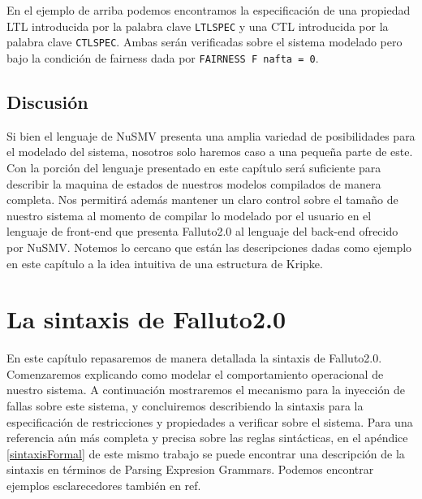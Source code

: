 \documentclass[titlepage, 12pt]{book}
\begin{document}
En el ejemplo de arriba podemos encontramos la especificaci\'on de una propiedad LTL introducida por la palabra clave \texttt{LTLSPEC} y una CTL introducida por la palabra clave \texttt{CTLSPEC}. Ambas ser\'an verificadas sobre el sistema modelado pero bajo la condici\'on de fairness dada por \texttt{FAIRNESS F nafta = 0}.

\section*{Discusi\'on}

Si bien el lenguaje de NuSMV presenta una amplia variedad de posibilidades para el modelado del sistema, nosotros solo haremos caso a una peque\~na parte de este. Con la porci\'on del lenguaje presentado en este cap\'itulo ser\'a suficiente para describir la maquina de estados de nuestros modelos compilados de manera completa. Nos permitir\'a adem\'as mantener un claro control sobre el tama\~no de nuestro sistema al momento de compilar lo modelado por el usuario en el lenguaje de front-end que presenta Falluto2.0 al lenguaje del back-end ofrecido por NuSMV. Notemos lo cercano que est\'an las descripciones dadas como ejemplo en este cap\'itulo a la idea intuitiva de una estructura de Kripke.



\chapter{La sintaxis de Falluto2.0}
\label{sintaxisDeFalluto}

En este cap\'itulo repasaremos de manera detallada la sintaxis de Falluto2.0. Comenzaremos explicando como modelar el comportamiento operacional de nuestro sistema. A continuaci\'on mostraremos el mecanismo para la inyecci\'on de fallas sobre este sistema, y concluiremos describiendo la sintaxis para la especificaci\'on de restricciones y propiedades a verificar sobre el sistema. Para una referencia a\'un m\'as completa y precisa sobre las reglas sint\'acticas, en el ap\'endice \ref{sintaxisFormal} de este mismo trabajo se puede encontrar una descripci\'on de la sintaxis en t\'erminos de Parsing Expresion Grammars. Podemos encontrar ejemplos esclarecedores tambi\'en en ref{}.
\end{document}
